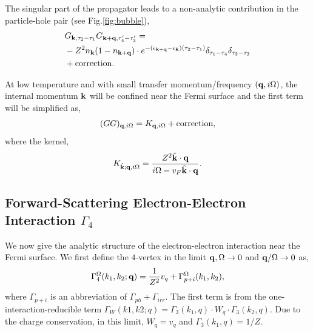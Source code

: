 \documentclass[reprint,amsmath,amssymb,aps,prb]{revtex4-1}
\begin{document}
The singular part of the propagator leads to a non-analytic contribution in the particle-hole pair (see Fig.\ref{fig:bubble}),
\begin{align}
     & G_{\mathbf{k}, \tau_2-\tau_1} G_{\mathbf{k}+\mathbf{q},\tau_4'-\tau_3'}=\nonumber                                                                                    \\
     & -Z^2 n_{\mathbf{k}}(1-n_{\mathbf{k}+\mathbf{q}})\cdot e^{-(\epsilon_{\mathbf{k}+\mathbf{q}}-\epsilon_{\mathbf{k}})(\tau_2-\tau_1)} \delta_{\tau_1-\tau_4}\delta_{\tau_2-\tau_3} \nonumber \\
     & +\text{correction}.
\end{align}

At low temperature and with small transfer momentum/frequency $(\mathbf{q}, i\Omega)$, the internal momentum $\mathbf{k}$ will be confined near the Fermi surface and the first term will be simplified as,
\begin{equation}
    (GG)_{\mathbf{q},i\Omega}=K_{\mathbf{q},i\Omega}+\text{correction},
\end{equation}
where the kernel,
\begin{equation}
    K_{\hat{\mathbf{k}}; \mathbf{q},i\Omega}=\frac{Z^2\hat{\mathbf{k}}\cdot \mathbf{q}}{i\Omega-v_F \hat{\mathbf{k}}\cdot \mathbf{q}}.
\end{equation}


\subsection{Forward-Scattering Electron-Electron Interaction $\Gamma_4$}
\label{appendix:renormalization}

We now give the analytic structure of the electron-electron interaction near the Fermi surface. We first define the $4$-vertex in the limit $\mathbf{q}, \Omega\rightarrow 0$ and $\mathbf{q}/\Omega \rightarrow 0$ as,
\begin{equation}
    \label{eq:gamma_4_omega}
    \Gamma_4^\Omega (k_1, k_2; \mathbf{q})=\frac{1}{Z^2}v_q+\Gamma_{p+i}^\Omega(k_1, k_2),
\end{equation}
where $\Gamma_{p+i}$ is an abbreviation of $\Gamma_{ph}+\Gamma_{irr}$. The first term is from the one-interaction-reducible term $\Gamma_W (k1, k2; q)=\Gamma_3(k_1, q) \cdot W_q \cdot \Gamma_3(k_2, q)$. Due to the charge conservation\cite{agd}, in this limit, $W_q=v_q$ and $\Gamma_3(k_1, q)=1/Z$.
\end{document}
